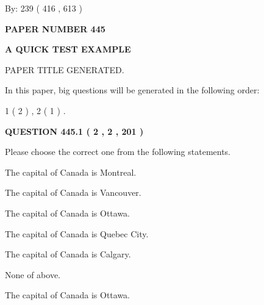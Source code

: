 \documentclass[12pt]{article}
\begin{document}
   
\hspace{1.0in} By: 
 239 ( 416 ,  613 )
   
   
   
   
\newpage 
\setcounter{page}{ 
   445001 } 
   
   
   
   
 {\textbf{ \Large{ PAPER NUMBER  445  }}}
   
   
\vspace{0.2in}
   
   
   
   
   
   
   
   
 \vspace{0.2in}
{\LARGE {\textbf{ A QUICK TEST EXAMPLE}}}
   
   
 PAPER TITLE GENERATED.
   
   
   
\vspace{0.2in}
   
In this paper, big questions will be generated in the following order: 
   
   
   1 ( 2 )
 ,
   2 ( 1 )
 .
  
\vspace{0.2in}
  
{\textbf{\Large{QUESTION
445.1 
 ( 2 , 2 , 201 )
}}}
  
  
Please choose the correct one from the following statements.
 
 
The capital of Canada is Montreal.
 
 
The capital of Canada is Vancouver.
 
 
The capital of Canada is Ottawa.
 
 
The capital of Canada is Quebec City.
 
 
The capital of Canada is Calgary.
 
 
 None of above.
 
 
\noindent{}
 
 
The capital of Canada is Ottawa.
 
 
\noindent{}
 
\end{document}
